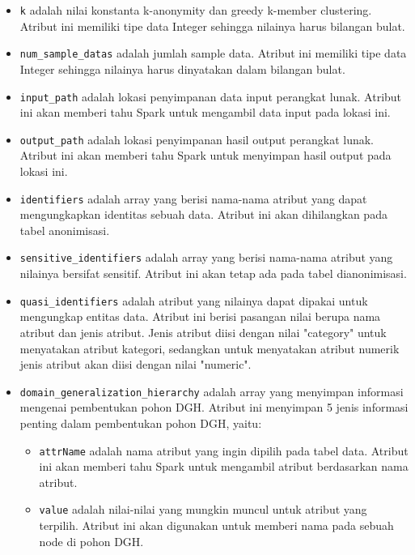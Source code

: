 \begin{itemize}
\item \texttt{k} adalah nilai konstanta k-anonymity dan greedy k-member clustering. Atribut ini memiliki tipe data Integer sehingga nilainya harus bilangan bulat.

\item \texttt{num\_sample\_datas} adalah jumlah sample data. Atribut ini memiliki tipe data Integer sehingga nilainya harus dinyatakan dalam bilangan bulat.

\item \texttt{input\_path} adalah lokasi penyimpanan data input perangkat lunak. Atribut ini akan memberi tahu Spark untuk mengambil data input pada lokasi ini.

\item \texttt{output\_path} adalah lokasi penyimpanan hasil output perangkat lunak. Atribut ini akan memberi tahu Spark untuk menyimpan hasil output pada lokasi ini.

\item \texttt{identifiers} adalah array yang berisi nama-nama atribut yang dapat mengungkapkan identitas sebuah data. Atribut ini akan dihilangkan pada tabel anonimisasi.

\item \texttt{sensitive\_identifiers} adalah array yang berisi nama-nama atribut yang nilainya bersifat sensitif. Atribut ini akan tetap ada pada tabel dianonimisasi.

\item \texttt{quasi\_identifiers} adalah atribut yang nilainya dapat dipakai untuk mengungkap entitas data. Atribut ini berisi pasangan nilai berupa nama atribut dan jenis atribut. Jenis atribut diisi dengan nilai "category" untuk menyatakan atribut kategori, sedangkan untuk menyatakan atribut numerik jenis atribut akan diisi dengan nilai "numeric".

\item \texttt{domain\_generalization\_hierarchy} adalah array yang menyimpan informasi mengenai pembentukan pohon DGH. Atribut ini menyimpan 5 jenis informasi penting dalam pembentukan pohon DGH, yaitu:

\begin{itemize}
\item \texttt{attrName} adalah nama atribut yang ingin dipilih pada tabel data. Atribut ini akan memberi tahu Spark untuk mengambil atribut berdasarkan nama atribut.

\item \texttt{value} adalah nilai-nilai yang mungkin muncul untuk atribut yang terpilih. Atribut ini akan digunakan untuk memberi nama pada sebuah node di pohon DGH.


\end{itemize}
\end{itemize}
